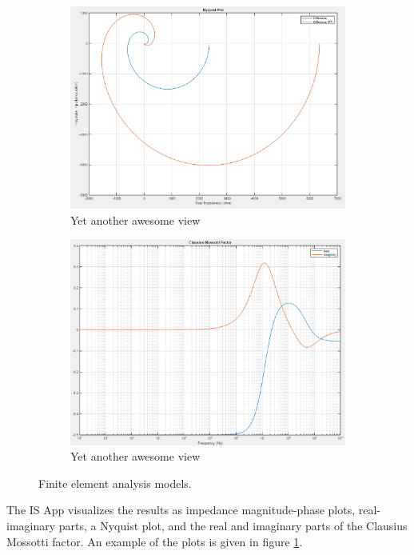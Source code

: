 \begin{figure}[h]
\begin{subfigure}[b]{0.45\textwidth}
        \includegraphics[width=\textwidth]{images/IS_APP_Nyquist.png}
        \caption{Yet another awesome view}
    \end{subfigure}
    \hfill
    \begin{subfigure}[b]{0.45\textwidth}
        \centering
        \includegraphics[width=\textwidth]{images/IS_APP_FCM.png}
        \caption{Yet another awesome view}
    \end{subfigure}
    \caption{Finite element analysis models.}
    \label{fig:IS_APP_IS_Results}
\end{figure}

\par The IS App visualizes the results as impedance magnitude-phase plots, real-imaginary parts, a Nyquist plot, and the real and imaginary parts of the Clausius Mossotti factor. An example of the plots is given in figure \ref{fig:IS_APP_IS_Results}.

